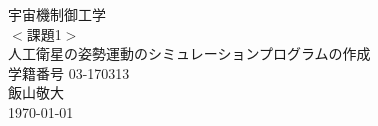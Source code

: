 \documentclass[class=article, crop=false, dvipdfmx, fleqn]{standalone}
\begin{document}
\begin{titlepage}
\begin{center}
\vspace*{80truept}
{\huge 宇宙機制御工学}\\ %
\vspace{15truept}
{\huge $<$課題1$>$} \\
\vspace{10truept}
{\huge 人工衛星の姿勢運動のシミュレーションプログラムの作成}\\ %
\vspace{150truept}
{\large 学籍番号 03-170313}\\ %
\vspace{10truept}
{\large 飯山敬大}\\ %
\vspace{10truept}
{\large \today}\\ %
\end{center}
\end{titlepage}
\end{document}
